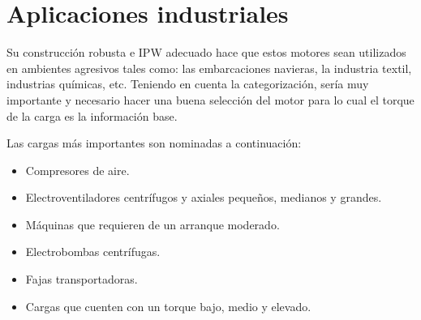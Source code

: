 \documentclass[a4paper,12pt]{article}
\begin{document}
\section{Aplicaciones industriales}
Su construcción robusta e IPW adecuado hace que estos motores sean utilizados en ambientes agresivos tales como: las embarcaciones navieras, la industria textil, industrias químicas, etc. Teniendo en cuenta la categorización, sería muy importante y necesario hacer una buena selección del motor para lo cual el torque de la carga es la información base.

Las cargas más importantes son nominadas a continuación:
\begin{itemize}
    \item Compresores de aire.
    \item Electroventiladores centrífugos y axiales pequeños, medianos y grandes.
    \item Máquinas que requieren de un arranque moderado.
    \item Electrobombas centrífugas.
    \item Fajas transportadoras.
    \item Cargas que cuenten con un torque bajo, medio y elevado.
\end{itemize}
\newpage
\end{document}
